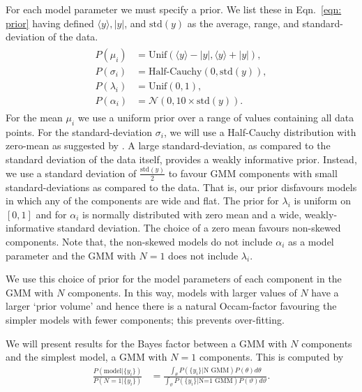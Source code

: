 \documentclass[../full_thesis/full_thesis.tex]{subfiles}
\begin{document}
\begin{subappendices}
\newcommand{\yave}{\langle y \rangle}
\newcommand{\yran}{| y |}
\newcommand{\ystd}{\textrm{std}(y)}
For each model parameter we must specify a prior. We list these in
Eqn.~\eqref{eqn: prior} having defined $\yave, \yran$, and $\ystd$ as the average,
range, and standard-deviation of the data.
\begin{align}
\begin{split}
P(\mu_i) & = \textrm{Unif}(\yave - \yran, \yave + \yran), \\
P(\sigma_i)  &= \textrm{Half-Cauchy}\left(0, \ystd\right), \\
P(\lambda_i)  &= \textrm{Unif}(0, 1), \\
P(\alpha_i)  &= \mathcal{N}(0, 10\times\ystd).
\end{split}
\label{eqn: prior}
\end{align}
For the mean $\mu_i$ we use a uniform prior over a range of values containing
all data points.  For the standard-deviation $\sigma_i$, we will use a
Half-Cauchy distribution with zero-mean as suggested by
\citet{gelman2006prior}. A large standard-deviation, as compared to the
standard deviation of the data itself, provides a weakly informative prior.
Instead, we use a standard deviation of $\frac{\ystd}{2}$ to favour GMM
components with small standard-deviations as compared to the data. That is, our
prior disfavours models in which any of the components are wide and flat. The
prior for $\lambda_i$ is uniform on $[0, 1]$ and for $\alpha_i$ is normally
distributed with zero mean and a wide, weakly-informative standard deviation.
The choice of a zero mean favours non-skewed components. Note that, the
non-skewed models do not include $\alpha_i$ as a model parameter and the GMM
with $N=1$ does not include $\lambda_i$.

We use this choice of prior for the model parameters of each component in the
GMM with $N$ components.  In this way, models with larger values of $N$ have a
larger `prior volume' and hence there is a natural Occam-factor favouring the
simpler models with fewer components; this prevents over-fitting.

We will present results for the Bayes factor between a GMM with $N$ components
and the simplest model, a GMM with $N=1$  components. This is computed by
\begin{align}
\frac{P(\textrm{model}| \{y_i\})}{P(N=1|\{y_i\})} & =
\frac{\int_{\theta}P(\{y_i\}| \textrm{N GMM}) P(\theta) d\theta}
{\int_{\vartheta}P(\{y_i\} | \textrm{N=1 GMM}) P(\vartheta) d\vartheta}.
\end{align}


\end{subappendices}
\end{document}
